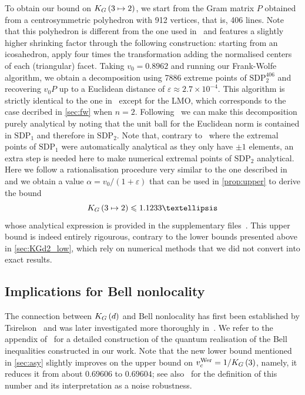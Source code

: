 \documentclass[10pt,aps,notitlepage,onecolumn,pra,superscriptaddress]{revtex4-1}
\renewcommand{\leq}{\leqslant}
\newcommand\cut[2]{\mathrm{SDP}_{#1}^{#2}}
\newcommand\KG[2]{K_G\left({#1}\ifx#2\empty\else\mapsto\fi{#2}\right)}
\begin{document}
To obtain our bound on $\KG{3}{2}$, we start from the Gram matrix $P$ obtained from a centrosymmetric polyhedron with 912 vertices, that is, 406 lines.
Note that this polyhedron is different from the one used in~\cite{DIB+23} and features a slightly higher shrinking factor through the following construction: starting from an icosahedron, apply four times the transformation adding the normalised centers of each (triangular) facet.
Taking $v_0=0.8962$ and running our Frank-Wolfe algorithm, we obtain a decomposition using 7886 extreme points of $\cut{2}{406}$ and recovering $v_0P$ up to a Euclidean distance of $\varepsilon\approx2.7\times10^{-4}$.
This algorithm is strictly identical to the one in~\cite{DIB+23} except for the LMO, which corresponds to the case decribed in \cref{sec:fw} when $n=2$.
Following~\cite[Appendix~D]{DIB+23} we can make this decomposition purely analytical by noting that the unit ball for the Euclidean norm is contained in $\cut{1}{}$ and therefore in $\cut{2}{}$.
Note that, contrary to~\cite{DIB+23} where the extremal points of $\cut{1}{}$ were automatically analytical as they only have $\pm1$ elements, an extra step is needed here to make numerical extremal points of $\cut{2}{}$ analytical.
Here we follow a rationalisation procedure very similar to the one described in~\cite[Appendix~A]{DIB+23} and we obtain a value $\alpha=v_0/(1+\varepsilon)$ that can be used in \cref{prop:upper} to derive the bound
\begin{equation}
  \KG{3}{2}\leq1.1233\ldots
  \label{eqn:lowerKG32}
\end{equation}
whose analytical expression is provided in the supplementary files~\cite{Note1}.
This upper bound is indeed entirely rigourous, contrary to the lower bounds presented above in \cref{sec:KGd2_low}, which rely on numerical methods that we did not convert into exact results.

\subsection{Implications for Bell nonlocality}
\label{sec:quantum}

The connection between $\KG{d}{}$ and Bell nonlocality has first been established by Tsirelson~\cite{Tsi87} and was later investigated more thoroughly in~\cite{AGT06}.
We refer to the appendix of~\cite{VP08} for a detailed construction of the quantum realisation of the Bell inequalities constructed in our work.
Note that the new lower bound mentioned in \cref{sec:asy} slightly improves on the upper bound on $v_c^\mathrm{Wer}=1/\KG{3}{}$, namely, it reduces it from about $0.69606$ to $0.69604$; see also~\cite{DIB+23} for the definition of this number and its interpretation as a noise robustness.
\end{document}
